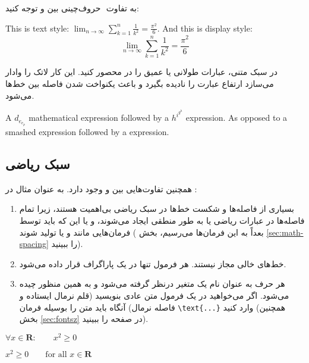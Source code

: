 به تفاوت ‌ حروف‌چینی بین 
 و 
 توجه کنید: 
\begin{example}
This is text style: 
$\lim_{n \to \infty} 
 \sum_{k=1}^n \frac{1}{k^2} 
 = \frac{\pi^2}{6}$.
And this is display style:
 \begin{equation}
  \lim_{n \to \infty} 
  \sum_{k=1}^n \frac{1}{k^2} 
  = \frac{\pi^2}{6}
 \end{equation}
\end{example}

در سبک‌ متنی، عبارات طولانی یا عمیق را در   محصور کنید. این کار لاتک را وادار می‌سازد ارتفاع عبارت را نادیده بگیرد و باعث یکنواخت شدن فاصله بین خط‌ها می‌شود.

\begin{example}
A $d_{e_{e_p}}$ mathematical
expression  followed by a
$h^{i^{g^h}}$ expression. As
opposed to a smashed 
 expression 
followed by a
 expression.
\end{example}
\subsection{سبک ریاضی}

همچنین تفاوت‌هایی بین 
 و 
وجود دارد. به عنوان مثال در :

\begin{enumerate}

\item {}
بسیاری از فاصله‌ها و شکست خط‌ها در سبک ریاضی بی‌اهمیت هستند، زیرا تمام فاصله‌ها در عبارات ریاضی یا به طور منطقی ایجاد می‌شوند، و یا این که باید توسط فرمان‌هایی مانند  \ci{,} و  یا
 تولید ‌شوند 
( بعداً به این فرمان‌ها می‌رسیم، بخش 
\ref{sec:math-spacing}
 را ببینید).
 
\item خط‌های خالی مجاز نیستند. هر فرمول تنها در یک پاراگراف قرار داده می‌شود.

\item هر حرف به عنوان نام یک متغیر درنظر گرفته می‌شود و به همین منظور چیده می‌شود. اگر می‌خواهید در یک فرمول متن عادی بنویسید (قلم نرمال ایستاده و فاصله نرمال)
آنگاه باید متن را بوسیله فرمان  \verb|\text{...}| وارد کنید 
(همچنین بخش  
\ref{sec:fontsz}
در صفحه  
\pageref{sec:fontsz} را  ببینید).
\end{enumerate}
\begin{example}
$\forall x \in \mathbf{R}:
 \qquad x^{2} \geq 0$
\end{example}
\begin{example}
$x^{2} \geq 0\qquad
 \text{for all }x\in\mathbf{R}$
\end{example}

